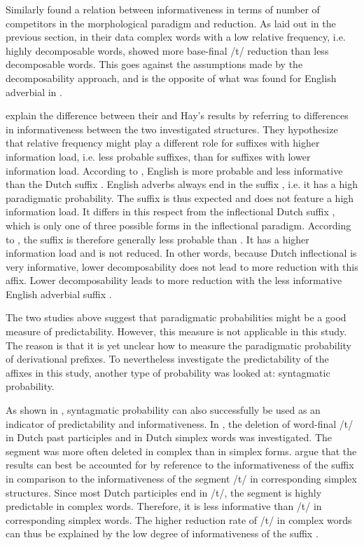 {  
 Similarly \cite{Schuppler.2012} found a relation between informativeness in terms of number of competitors in the morphological paradigm and reduction. 
 As laid out in the previous section, in their data complex words with a low relative frequency, i.e. highly decomposable words, showed more base-final /t/ reduction than less decomposable words. This goes against the assumptions made by the decomposability approach, and is the opposite of what was found for English adverbial  in \cite{Hay.2003}. 
 
 \cite{Schuppler.2012} explain the difference between their and Hay's results by referring to differences in informativeness between the two investigated structures. 
 They hypothesize that relative frequency might play a different role for suffixes with higher information load, i.e. less probable suffixes, than for suffixes with lower information load. According to \cite{Schuppler.2012}, English  is more probable and less informative than the Dutch suffix . 
 English adverbs always end in the suffix , i.e. it has a high paradigmatic probability. The suffix is thus expected and does not feature a high information load. It differs in this respect from the inflectional Dutch suffix , which is only one of three possible forms in the inflectional paradigm. According to \cite{Schuppler.2012}, the suffix  is therefore generally less probable than . It has a higher information load and is not reduced. In other words, because Dutch inflectional  is very informative, lower decomposability does not lead to more reduction with this affix. Lower decomposability leads to more reduction with the less informative English adverbial suffix  .
 
 
The two studies above suggest that paradigmatic probabilities might be a good measure of predictability. However, this measure is not applicable in this study. The reason is that it is yet unclear how to measure the paradigmatic probability of derivational prefixes. 
 To nevertheless investigate the predictability of the affixes in this study, 
another type of probability was looked at: syntagmatic probability. 

As shown in \cite{Hanique.06.03.2013}, syntagmatic probability can also successfully be used as an indicator of predictability and informativeness. In \cite{Hanique.06.03.2013}, the deletion of word-final /t/ in Dutch past participles and in Dutch simplex words was investigated.  The segment was more often deleted in complex than in simplex forms. 
  \cite{Hanique.2012}  argue that the results can best be accounted for by reference to the informativeness of the suffix  in comparison to the informativeness of the segment /t/ in corresponding simplex structures. Since most Dutch participles end in /t/, the segment is highly predictable in complex words. Therefore, it is less informative than /t/ in corresponding simplex words. The higher reduction rate of /t/ in complex words can thus be explained by the low degree of informativeness of the suffix .
  
}
